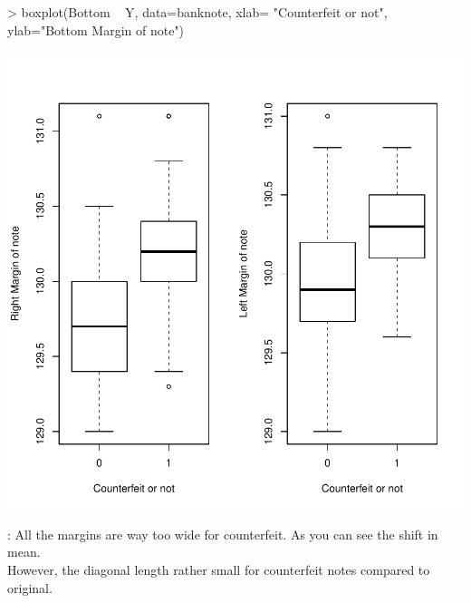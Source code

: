 \documentclass{article}
\begin{document}
\begin{enumerate}
\begin{enumerate}
\begin{center}
\begin{Schunk}
\begin{Sinput}
> boxplot(Bottom ~ Y, data=banknote, xlab= "Counterfeit or not", ylab="Bottom Margin of note")
\end{Sinput}
\end{Schunk}
\includegraphics{debseal_HW2-003}

			\end{center}
		\emph{}: All the margins are way too wide for counterfeit. As you can see the shift in mean.\\
		However, the diagonal length rather small for counterfeit notes compared to original.
		\end{enumerate}		


\end{enumerate}
\end{document}
